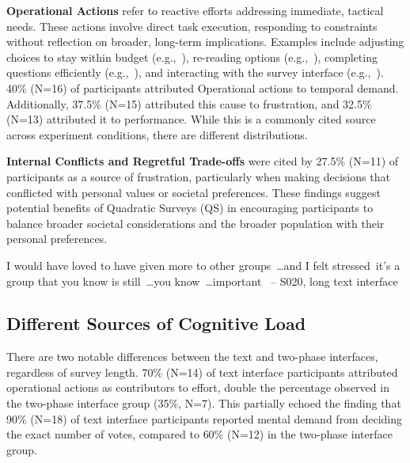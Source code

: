 \textbf{Operational Actions} refer to reactive efforts addressing immediate, tactical needs. These actions involve direct task execution, responding to constraints without reflection on broader, long-term implications. Examples include adjusting choices to stay within budget (e.g.,~), re-reading options (e.g.,~), completing questions efficiently (e.g.,~), and interacting with the survey interface (e.g.,~). 40\% (N=16) of participants attributed Operational actions to temporal demand. Additionally, 37.5\% (N=15) attributed this cause to frustration, and 32.5\% (N=13) attributed it to performance. While this is a commonly cited source across experiment conditions, there are different distributions. 

\textbf{Internal Conflicts and Regretful Trade-offs} were cited by 27.5\% (N=11) of participants as a source of frustration, particularly when making decisions that conflicted with personal values or societal preferences. These findings suggest potential benefits of Quadratic Surveys (QS) in encouraging participants to balance broader societal considerations and the broader population with their personal preferences.

\begin{displayquote}
I would have loved to have given more to other groups~\ldots and I felt stressed~\bracketellipsis it's a group that you know is still~\ldots you know~\ldots important~\bracketellipsis
\noindent \hfill -- S020, long text interface
\end{displayquote}


\subsection{Different Sources of Cognitive Load}
There are two notable differences between the text and two-phase interfaces, regardless of survey length. 70\% (N=14) of text interface participants attributed operational actions as contributors to effort, double the percentage observed in the two-phase interface group (35\%, N=7). This partially echoed the finding that 90\% (N=18) of text interface participants reported mental demand from deciding the exact number of votes, compared to 60\% (N=12) in the two-phase interface group.

